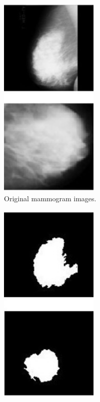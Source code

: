\begin{figure}[h]
\centering
\begin{subfigure}{.5\textwidth}
  \centering
  \includegraphics[width=0.52\textwidth]{Dissertation/figures/litsurvey/segmentation_example_original.jpg}
  \caption{Original mammogram images.}
  \label{fig:original-mammogram}
\end{subfigure}%
\begin{subfigure}{.5\textwidth}
  \centering
  \includegraphics[width=0.52\textwidth]{Dissertation/figures/litsurvey/segmentation_example_segmented.jpg}

\end{subfigure}
\end{figure}
